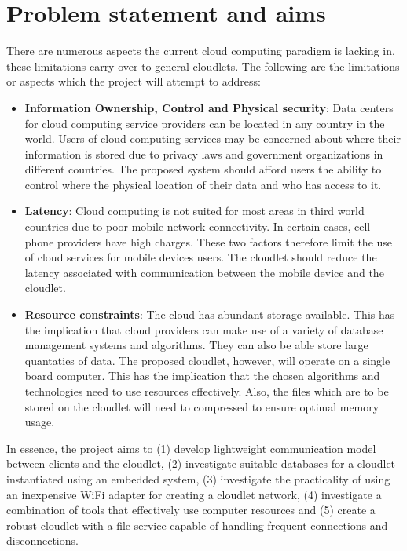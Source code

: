 \section {Problem statement and aims}

There are numerous aspects the current cloud computing paradigm is lacking in, these limitations carry over to general cloudlets. The following are the limitations or aspects which the project will attempt to address:

  \begin{itemize}
  \itemsep0em
  \item \textbf{Information Ownership, Control and Physical security}: Data centers for cloud computing service providers can be located in any country in the world. Users
  of cloud computing services may be concerned about where their information is stored due to privacy laws and government organizations in different countries. The proposed
  system should afford users the ability to control where the physical location of their data and who has access to it.

   \item \textbf{Latency}: Cloud computing is not suited for most areas in third world countries due to poor mobile network connectivity. In certain cases, cell phone providers
   have high charges. These two factors therefore limit the use of cloud services for mobile devices users. The cloudlet should reduce the latency associated with communication
   between the mobile device and the cloudlet.

  \item \textbf{Resource constraints}: The cloud has abundant storage available. This has the implication that cloud providers can make use of a variety of database management
  systems and algorithms. They can also
  be able store large quantaties of data. The proposed cloudlet, however, will operate on a single board computer. This has the implication that the chosen algorithms and
  technologies need to use resources effectively.
  Also, the files which are to be stored on the cloudlet will need to compressed to ensure optimal memory usage.

 \end{itemize}
 
 In essence, the project aims to (1) develop lightweight communication model
between clients and the cloudlet, (2) investigate suitable databases for a cloudlet instantiated using an embedded system, (3) investigate the practicality of using an inexpensive WiFi adapter for creating a cloudlet network, (4) investigate a combination of tools that effectively use computer resources and (5) create a robust cloudlet with a file service capable of handling frequent connections and disconnections.


